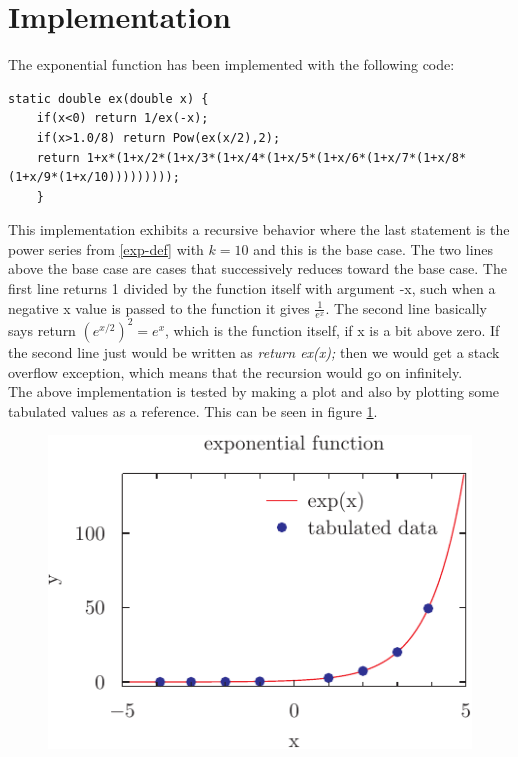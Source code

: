 \documentclass[twocolumn, a4paper]{article}
\begin{document}
\section*{Implementation}
The exponential function has been implemented with the following code:
\begin{lstlisting}
static double ex(double x) {
	if(x<0) return 1/ex(-x);
	if(x>1.0/8) return Pow(ex(x/2),2);
	return 1+x*(1+x/2*(1+x/3*(1+x/4*(1+x/5*(1+x/6*(1+x/7*(1+x/8*(1+x/9*(1+x/10)))))))));
	}
\end{lstlisting}
This implementation exhibits a recursive behavior where the last statement is the power series from \eqref{exp-def} with $k=10$ and this is the base case. The two lines above the base case are cases that successively reduces toward the base case. The first line returns 1 divided by the function itself with argument -x, such when a negative x value is passed to the function it gives $\frac{1}{\textit{e}^x}$. The second line basically says return $\left(\textit{e}^{x/2}\right)^2 = \textit{e}^x$, which is the function itself, if x is a bit above zero. If the second line just would be written as \textit{return ex(x);} then we would get a stack overflow exception, which means that the recursion would go on infinitely.\\
The above implementation is tested by making a plot and also by plotting some tabulated values as a reference. This can be seen in figure \ref{exp-graph}.
\begin{figure}[!h]
	\includegraphics{exp_pyx.pdf}
	\label{exp-graph}
\end{figure}
\end{document}
